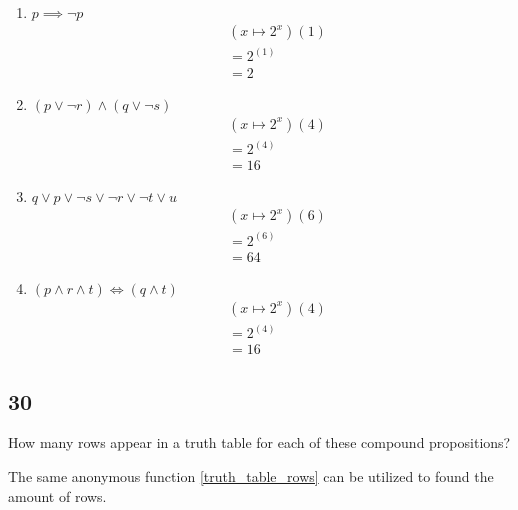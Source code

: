 \documentclass{article}
\begin{document}
\begin{enumerate}[label = \boldalph]
	\item $ p \implies \neg p $
	      \begin{align*}
		       & \left( x \mapsto 2^{x} \right)\left( 1 \right) \\
		       & = 2^{(1)}                                      \\
		       & = 2
	      \end{align*}

	\item $ \left( p \lor \neg r \right) \land \left( q \lor \neg s \right) $
	      \begin{align*}
		       & \left( x \mapsto 2^{x} \right)\left( 4 \right) \\
		       & = 2^{(4)}                                      \\
		       & = 16
	      \end{align*}

	\item $ q \lor p \lor \neg s \lor \neg r \lor \neg t \lor u $
	      \begin{align*}
		       & \left( x \mapsto 2^{x} \right)\left( 6 \right) \\
		       & = 2^{(6)}                                      \\
		       & = 64
	      \end{align*}

	\item $ \left( p \land r \land t \right) \iff \left( q \land t \right) $
	      \begin{align*}
		       & \left( x \mapsto 2^{x} \right)\left( 4 \right) \\
		       & = 2^{(4)}                                      \\
		       & = 16
	      \end{align*}
\end{enumerate}

\subsection{30}

How many rows appear in a truth table for each of these compound propositions?

The same anonymous function \eqref{truth_table_rows} can be utilized to found the amount of rows.
\end{document}
